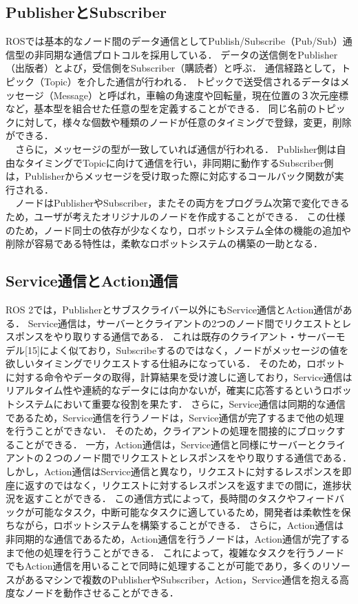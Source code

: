 \subsection{PublisherとSubscriber}
ROSでは基本的なノード間のデータ通信としてPublish/Subscribe（Pub/Sub）通信型の非同期な通信プロトコルを採用している．
データの送信側をPublisher（出版者）とよび，受信側をSubscriber（購読者）と呼ぶ．
通信経路として，トピック（Topic）を介した通信が行われる．
トピックで送受信されるデータはメッセージ（Message）と呼ばれ，車輪の角速度や回転量，現在位置の３次元座標など，基本型を組合せた任意の型を定義することができる．
同じ名前のトピックに対して，様々な個数や種類のノードが任意のタイミングで登録，変更，削除ができる．
\\　さらに，メッセージの型が一致していれば通信が行われる．
Publisher側は自由なタイミングでTopicに向けて通信を行い，非同期に動作するSubscriber側は，Publisherからメッセージを受け取った際に対応するコールバック関数が実行される．
\\　ノードはPublisherやSubscriber，またその両方をプログラム次第で変化できるため，ユーザが考えたオリジナルのノードを作成することができる．
この仕様のため，ノード同士の依存が少なくなり，ロボットシステム全体の機能の追加や削除が容易である特性は，柔軟なロボットシステムの構築の一助となる．
\subsection{Service通信とAction通信}
ROS 2では，Publisherとサブスクライバー以外にもService通信とAction通信がある．
Service通信は，サーバーとクライアントの2つのノード間でリクエストとレスポンスをやり取りする通信である．
これは既存のクライアント・サーバーモデル[15]によく似ており，Subscribeするのではなく，ノードがメッセージの値を欲しいタイミングでリクエストする仕組みになっている．
そのため，ロボットに対する命令やデータの取得，計算結果を受け渡しに適しており，Service通信はリアルタイム性や連続的なデータには向かないが，確実に応答するというロボットシステムにおいて重要な役割を果たす．
さらに，Service通信は同期的な通信であるため，Service通信を行うノードは，Service通信が完了するまで他の処理を行うことができない．
そのため，クライアントの処理を間接的にブロックすることができる．
一方，Action通信は，Service通信と同様にサーバーとクライアントの２つのノード間でリクエストとレスポンスをやり取りする通信である．
しかし，Action通信はService通信と異なり，リクエストに対するレスポンスを即座に返すのではなく，リクエストに対するレスポンスを返すまでの間に，進捗状況を返すことができる．
この通信方式によって，長時間のタスクやフィードバックが可能なタスク，中断可能なタスクに適しているため，開発者は柔軟性を保ちながら，ロボットシステムを構築することができる．
さらに，Action通信は非同期的な通信であるため，Action通信を行うノードは，Action通信が完了するまで他の処理を行うことができる．
これによって，複雑なタスクを行うノードでもAction通信を用いることで同時に処理することが可能であり，多くのリソースがあるマシンで複数のPublisherやSubscriber，Action，Service通信を抱える高度なノードを動作させることができる．

